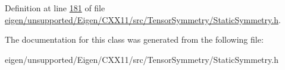 Definition at line \hyperlink{eigen_2unsupported_2_eigen_2_c_x_x11_2src_2_tensor_symmetry_2_static_symmetry_8h_source_l00181}{181} of file \hyperlink{eigen_2unsupported_2_eigen_2_c_x_x11_2src_2_tensor_symmetry_2_static_symmetry_8h_source}{eigen/unsupported/\+Eigen/\+C\+X\+X11/src/\+Tensor\+Symmetry/\+Static\+Symmetry.\+h}.



The documentation for this class was generated from the following file\+:\begin{DoxyCompactItemize}
\item 
eigen/unsupported/\+Eigen/\+C\+X\+X11/src/\+Tensor\+Symmetry/\+Static\+Symmetry.\+h\end{DoxyCompactItemize}

